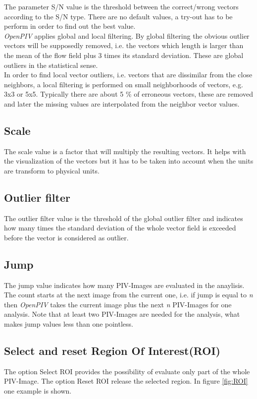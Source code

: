 The parameter S/N value is the threshold between the correct/wrong vectors according to the S/N 
type. There are no default values, a try-out has to be perform in order to find out the best 
value. \\ 

\emph{OpenPIV} applies global and local filtering. By global filtering the obvious outlier vectors 
will be supposedly  removed, i.e. the vectors which length is larger than the mean of the flow 
field plus 3 times its standard deviation. These are global outliers in the statistical sense. \\

In order to find local vector outliers, i.e. vectors that are dissimilar from the close neighbors, 
a local filtering is performed on small neighborhoods of vectors, e.g. 3x3 or 5x5. Typically 
there are about 5 \% of erroneous vectors, these are removed and later the missing 
values are interpolated from the neighbor vector values. 

\subsection{Scale}\label{Scale}
The scale value is a factor that will multiply the resulting vectors. It helps with the 
visualization of the vectors but it has to be taken into account when the units are transform 
to physical units.

\subsection{Outlier filter}\label{Outlier}
The outlier filter value is the threshold of the global outlier filter and indicates how many times 
the standard deviation of the whole vector field is exceeded before the vector is considered as 
outlier.

\subsection{Jump}\label{Jump}
The jump value indicates how many PIV-Images are evaluated in the anaylisis. The count starts at 
the next image from the current one, i.e. if jump is equal to \emph{n} then \emph{OpenPIV} takes 
the current image plus the next \emph{n} PIV-Images for one analysis. Note that at least two 
PIV-Images are needed for the analysis, what makes jump values less than one pointless.

\subsection{Select and reset Region Of Interest(ROI)}\label{ROI}
The option Select ROI provides the possibility of evaluate only part of the whole PIV-Image. The 
option Reset ROI release the selected region. In figure \ref{fig:ROI} one example is shown.

